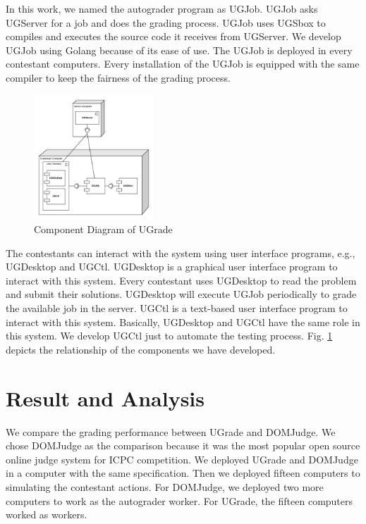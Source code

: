 \documentclass[conference,a4paper]{IEEEtran}
\begin{document}
In this work, we named the autograder program as UGJob. UGJob asks UGServer for a job and does the grading process. UGJob uses UGSbox to compiles and executes the source code it receives from UGServer. We develop UGJob using Golang because of its ease of use. The UGJob is deployed in every contestant computers. Every installation of the UGJob is equipped with the same compiler to keep the fairness of the grading process.

\begin{figure}[htbp]
\centerline{\includegraphics[width=0.4\textwidth]{images/paper-component.jpeg}}
\caption{Component Diagram of UGrade}
\label{component}
\end{figure}

The contestants can interact with the system using user interface programs, e.g., UGDesktop and UGCtl. UGDesktop is a graphical user interface program to interact with this system. Every contestant uses UGDesktop to read the problem and submit their solutions. UGDesktop will execute UGJob periodically to grade the available job in the server. UGCtl is a text-based user interface program to interact with this system. Basically, UGDesktop and UGCtl have the same role in this system. We develop UGCtl just to automate the testing process. Fig. \ref{component} depicts the relationship of the components we have developed.

\section{Result and Analysis}

We compare the grading performance between UGrade and DOMJudge. We chose DOMJudge as the comparison because it was the most popular open source online judge system for ICPC competition. We deployed UGrade and DOMJudge in a computer with the same specification. Then we deployed fifteen computers to simulating the contestant actions. For DOMJudge, we deployed two more computers to work as the autograder worker. For UGrade, the fifteen computers worked as workers.
\end{document}
